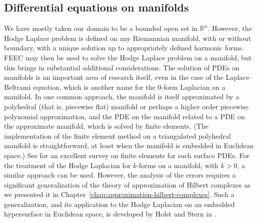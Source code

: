\subsection{{Differential equations on manifolds}}\label{sec:manifold-equations}

{We have mostly taken our domain to be a bounded open set in $\mathbb R^n$. However, the Hodge Laplace problem is defined on any Riemannian manifold, with or without boundary, with a unique solution up to appropriately defined harmonic forms. FEEC may then be used to solve the Hodge Laplace problem on a manifold, but this brings in substantial additional considerations. The solution of PDEs on manifolds is an important area of research itself, even in the case of the Laplace–Beltrami equation, which is another name for the 0-form Laplacian on a manifold. In one common approach, the manifold is itself approximated by a polyhedral (that is, piecewise flat) manifold or perhaps a higher order piecewise polynomial approximation, and the PDE on the manifold related to a PDE on the approximate manifold, which is solved by finite elements. (The implementation of the finite element method on a triangulated polyhedral manifold is straightforward, at least when the manifold is embedded in Euclidean space.) See  for an excellent survey on finite elements for such surface PDEs. For the treatment of the Hodge Laplacian for $k$-forms on a manifold, with $k>0$, a similar approach can be used. However, the analysis of the errors requires a significant generalization of the theory of approximation of Hilbert complexes as we presented it in Chapter~\ref{chap:approximation-hilbert-complexes}. Such a generalization, and its application to the Hodge Laplacian on an embedded hypersurface in Euclidean space, is developed by Holst and Stern in .}
